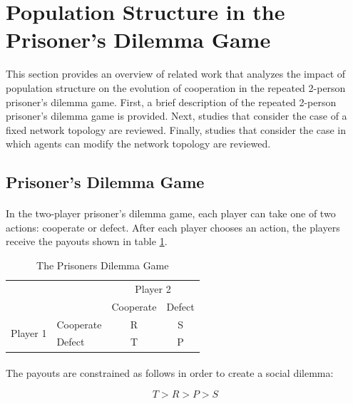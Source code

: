 \documentclass{article}
\begin{document}
    \section{Population Structure in the Prisoner's Dilemma Game}
    This section provides an overview of related work that analyzes the impact of population structure on the evolution of cooperation in the repeated 2-person prisoner's dilemma game.  First, a brief description of the repeated 2-person prisoner's dilemma game is provided.  Next, studies that consider the case of a fixed network topology are reviewed.  Finally, studies that consider the case in which agents can modify the network topology are reviewed.
    
    \subsection{Prisoner's Dilemma Game}
    \paragraph{}In the two-player prisoner's dilemma game, each player can take one of two actions: cooperate or defect.  After each player chooses an action, the players receive the payouts shown in table \ref{table:pdpayouts}.
    
    \begin{table}[h]
      \begin{center}
      \begin{tabular}{llcc}
    	\toprule
		&	&	\multicolumn{2}{c}{Player 2} \\ \cmidrule{3-4}
		&   & 	Cooperate & Defect  \\ \midrule
    	\multirow{2}{*}{Player 1}
    		& Cooperate   & R  & S  \\
    		& Defect  	  & T  & P \\ \bottomrule
      \end{tabular}
      \caption{The Prisoners Dilemma Game}
      \label{table:pdpayouts}
	  \end{center}
    \end{table}

    \paragraph{}The payouts are constrained as follows in order to create a social dilemma:

    \begin{equation}
    	T > R > P > S
    \end{equation}
    
\end{document}
